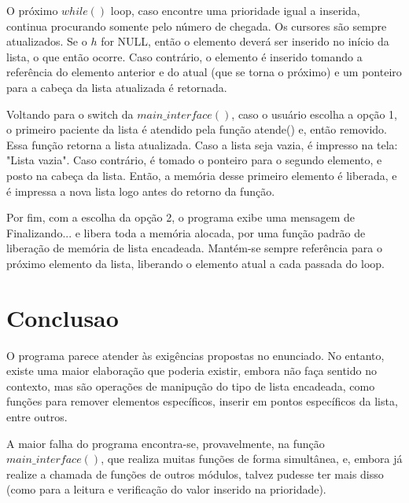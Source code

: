 \documentclass{article}
\begin{document}
O próximo $while()$ loop, caso encontre uma prioridade igual a inserida, continua procurando somente pelo número de chegada. Os cursores são sempre atualizados. Se o $h$ for NULL, então o elemento deverá ser inserido no início da lista, o que então ocorre. Caso contrário, o elemento é inserido tomando a referência do elemento anterior e do atual (que se torna o próximo) e um ponteiro para a cabeça da lista atualizada é retornada.

Voltando para o switch da $main\_interface()$, caso o usuário escolha a opção 1, o primeiro paciente da lista é atendido pela função atende() e, então removido. Essa função retorna a lista atualizada. Caso a lista seja vazia, é impresso na tela: "Lista vazia". Caso contrário, é tomado o ponteiro para o segundo elemento, e posto na cabeça da lista. Então, a memória desse primeiro elemento é liberada, e é impressa a nova lista logo antes do retorno da função.

Por fim, com a escolha da opção 2, o programa exibe uma mensagem de Finalizando... e libera toda a memória alocada, por uma função padrão de liberação de memória de lista encadeada. Mantém-se sempre referência para o próximo elemento da lista, liberando o elemento atual a cada passada do loop.

\section{Conclusao}
O programa parece atender às exigências propostas no enunciado. No entanto, existe uma maior elaboração que poderia existir, embora não faça sentido no contexto, mas são operações de manipução do tipo de lista encadeada, como funções para remover elementos específicos, inserir em pontos específicos da lista, entre outros.

A maior falha do programa encontra-se, provavelmente, na função $main\_interface()$, que realiza muitas funções de forma simultânea, e, embora já realize a chamada de funções de outros módulos, talvez pudesse ter mais disso (como para a leitura e verificação do valor inserido na prioridade). 
\end{document}
